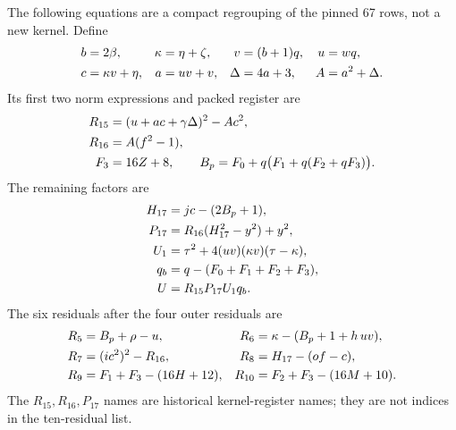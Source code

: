 \documentclass[11pt,letterpaper]{article}
\theoremstyle{definition}\newtheorem{definition}[theorem]{Definition}
\theoremstyle{remark}\newtheorem{remark}[theorem]{Remark}
\begin{document}
The following equations are a compact regrouping of the pinned 67 rows, not a new kernel. Define
\begin{align}
 b&=2\beta,&\kappa&=\eta+\zeta,&v&=(b+1)q,&u&=wq,\notag\\
 c&=\kappa v+\eta,&a&=uv+v,&\Delta&=4a+3,&A&=a^2+\Delta.\label{fup:dl:eq:normvars}
\end{align}
Its first two norm expressions and packed register are
\begin{align}
 R_{15}&=(u+ac+\gamma\Delta)^2-Ac^2,\notag\\
 R_{16}&=A(f^2-1),\notag\\
 F_3&=16Z+8,\qquad B_p=F_0+q\bigl(F_1+q(F_2+qF_3)\bigr).\label{fup:dl:eq:normdefs}
\end{align}
The remaining factors are
\begin{align}
 H_{17}&=jc-(2B_p+1),\notag\\
 P_{17}&=R_{16}(H_{17}^2-y^2)+y^2,\notag\\
 U_1&=\tau^2+4(uv)(\kappa v)(\tau-\kappa),\notag\\
 q_b&=q-(F_0+F_1+F_2+F_3),\notag\\
 U&=R_{15}P_{17}U_1q_b.\label{fup:dl:eq:unit}
\end{align}
The six residuals after the four outer residuals are
\begin{align}
 R_5&=B_p+\rho-u,&R_6&=\kappa-(B_p+1+h\,uv),\notag\\
 R_7&=(ic^2)^2-R_{16},&R_8&=H_{17}-(of-c),\notag\\
 R_9&=F_1+F_3-(16H+12),&R_{10}&=F_2+F_3-(16M+10).\label{fup:dl:eq:kernelres}
\end{align}
The $R_{15},R_{16},P_{17}$ names are historical kernel-register names; they are not indices in the ten-residual list.
\end{document}
